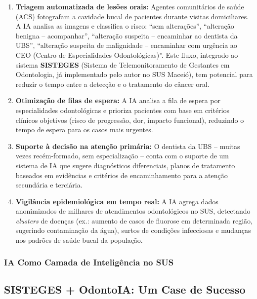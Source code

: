 \begin{enumerate}
  \item \textbf{Triagem automatizada de lesões orais:} Agentes comunitários de
    saúde (ACS) fotografam a cavidade bucal de pacientes durante visitas
    domiciliares. A IA analisa as imagens e classifica o risco: ``sem
    alterações'', ``alteração benigna -- acompanhar'', ``alteração suspeita --
    encaminhar ao dentista da UBS'', ``alteração suspeita de malignidade --
    encaminhar com urgência ao CEO (Centro de Especialidades Odontológicas)''.
    Este fluxo, integrado ao sistema \textbf{SISTEGES} (Sistema de
    Telemonitoramento de Gestantes em Odontologia, já implementado pelo autor
    no SUS Maceió), tem potencial para reduzir o tempo entre a detecção e o
    tratamento do câncer oral.

  \item \textbf{Otimização de filas de espera:} A IA analisa a fila de espera
    por especialidades odontológicas e prioriza pacientes com base em critérios
    clínicos objetivos (risco de progressão, dor, impacto funcional), reduzindo
    o tempo de espera para os casos mais urgentes.

  \item \textbf{Suporte à decisão na atenção primária:} O dentista da UBS --
    muitas vezes recém-formado, sem especialização -- conta com o suporte de um
    sistema de IA que sugere diagnósticos diferenciais, planos de tratamento
    baseados em evidências e critérios de encaminhamento para a atenção
    secundária e terciária.

  \item \textbf{Vigilância epidemiológica em tempo real:} A IA agrega dados
    anonimizados de milhares de atendimentos odontológicos no SUS, detectando
    \textit{clusters} de doenças (ex.: aumento de casos de fluorose em
    determinada região, sugerindo contaminação da água), surtos de condições
    infecciosas e mudanças nos padrões de saúde bucal da população.
\end{enumerate}

\subsubsection{IA Como Camada de Inteligência no SUS}

\subsection{SISTEGES + OdontoIA: Um Case de Sucesso}

